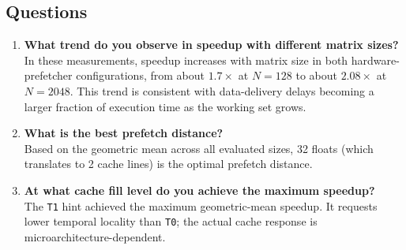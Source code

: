 \subsection{Questions}
\begin{enumerate}
    \item \textbf{What trend do you observe in speedup with different matrix sizes?} \\
    In these measurements, speedup increases with matrix size in both hardware-prefetcher configurations, from about $1.7\times$ at $N=128$ to about $2.08\times$ at $N=2048$. This trend is consistent with data-delivery delays becoming a larger fraction of execution time as the working set grows.
    
    \item \textbf{What is the best prefetch distance?} \\
    Based on the geometric mean across all evaluated sizes, 32 floats (which translates to 2 cache lines) is the optimal prefetch distance.
    
    \item \textbf{At what cache fill level do you achieve the maximum speedup?} \\
    The \texttt{T1} hint achieved the maximum geometric-mean speedup. It requests lower temporal locality than \texttt{T0}; the actual cache response is microarchitecture-dependent.
\end{enumerate}
